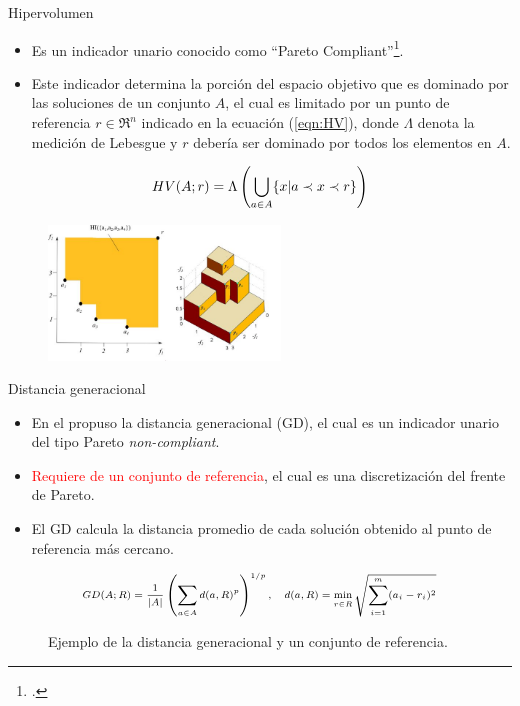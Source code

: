 \documentclass{beamer}
\begin{document}
\begin{frame}{Hipervolumen}
\begin{itemize}
\scriptsize
\justifying
\item Es un indicador unario conocido como ``Pareto Compliant''\footcite{zitzler1999evolutionary}.
\item Este indicador determina la porción del espacio objetivo que es dominado por las soluciones de un conjunto $A$, el cual es limitado por un punto de referencia $r \in \Re^n$ indicado en la ecuación (\ref{eqn:HV}), donde $\Lambda$ denota la medición de Lebesgue y $r$ debería ser dominado por todos los elementos en $A$.
\end{itemize}
\begin{equation}\label{eqn:HV}
\scriptsize
    HV(A;r) = \Lambda \left (  \bigcup_{a \in A} \{ x | a \prec x \prec r \} \right )
\end{equation}

\begin{figure}[H]
\centering
\includegraphics[width=0.55\textwidth]{HV.jpg}
\end{figure}
\end{frame}

\begin{frame}{Distancia generacional}
\begin{itemize}
\justifying
\scriptsize
\item En el \citeyear{Joel:GD} \citeauthor{Joel:GD} propuso la distancia generacional (GD), el cual es un indicador unario del tipo Pareto \textit{non-compliant}.
\item \textcolor{red}{Requiere de un conjunto de referencia}, el cual es una discretización del frente de Pareto.
\item El GD calcula la distancia promedio de cada solución obtenido al punto de referencia más cercano.
\end{itemize}
\begin{equation*}
\scriptsize
\begin{split}
GD(A; R) = \frac{1}{|A|} \left (   \sum_{a \in A} d(a, R)^p \right)^{1/p}, \quad d(a, R) = \min_{r \in R} \sqrt{\sum_{i=1}^m (a_i - r_i)^2}
\end{split}
\end{equation*}
\begin{figure}[H]
\centering

\caption{\scriptsize Ejemplo de la distancia generacional y un conjunto de referencia.} 
\end{figure}
\end{frame}
\end{document}
